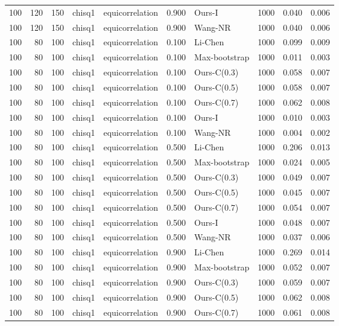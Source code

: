 \begin{tabular}{rrrllrlrrr}
100 & 120 & 150 & chisq1 & equicorrelation & 0.900 & Ours-I & 1000 & 0.040 & 0.006 \\
100 & 120 & 150 & chisq1 & equicorrelation & 0.900 & Wang-NR & 1000 & 0.040 & 0.006 \\
100 & 80 & 100 & chisq1 & equicorrelation & 0.100 & Li-Chen & 1000 & 0.099 & 0.009 \\
100 & 80 & 100 & chisq1 & equicorrelation & 0.100 & Max-bootstrap & 1000 & 0.011 & 0.003 \\
100 & 80 & 100 & chisq1 & equicorrelation & 0.100 & Ours-C(0.3) & 1000 & 0.058 & 0.007 \\
100 & 80 & 100 & chisq1 & equicorrelation & 0.100 & Ours-C(0.5) & 1000 & 0.058 & 0.007 \\
100 & 80 & 100 & chisq1 & equicorrelation & 0.100 & Ours-C(0.7) & 1000 & 0.062 & 0.008 \\
100 & 80 & 100 & chisq1 & equicorrelation & 0.100 & Ours-I & 1000 & 0.010 & 0.003 \\
100 & 80 & 100 & chisq1 & equicorrelation & 0.100 & Wang-NR & 1000 & 0.004 & 0.002 \\
100 & 80 & 100 & chisq1 & equicorrelation & 0.500 & Li-Chen & 1000 & 0.206 & 0.013 \\
100 & 80 & 100 & chisq1 & equicorrelation & 0.500 & Max-bootstrap & 1000 & 0.024 & 0.005 \\
100 & 80 & 100 & chisq1 & equicorrelation & 0.500 & Ours-C(0.3) & 1000 & 0.049 & 0.007 \\
100 & 80 & 100 & chisq1 & equicorrelation & 0.500 & Ours-C(0.5) & 1000 & 0.045 & 0.007 \\
100 & 80 & 100 & chisq1 & equicorrelation & 0.500 & Ours-C(0.7) & 1000 & 0.054 & 0.007 \\
100 & 80 & 100 & chisq1 & equicorrelation & 0.500 & Ours-I & 1000 & 0.048 & 0.007 \\
100 & 80 & 100 & chisq1 & equicorrelation & 0.500 & Wang-NR & 1000 & 0.037 & 0.006 \\
100 & 80 & 100 & chisq1 & equicorrelation & 0.900 & Li-Chen & 1000 & 0.269 & 0.014 \\
100 & 80 & 100 & chisq1 & equicorrelation & 0.900 & Max-bootstrap & 1000 & 0.052 & 0.007 \\
100 & 80 & 100 & chisq1 & equicorrelation & 0.900 & Ours-C(0.3) & 1000 & 0.059 & 0.007 \\
100 & 80 & 100 & chisq1 & equicorrelation & 0.900 & Ours-C(0.5) & 1000 & 0.062 & 0.008 \\
100 & 80 & 100 & chisq1 & equicorrelation & 0.900 & Ours-C(0.7) & 1000 & 0.061 & 0.008 \\

\end{tabular}
